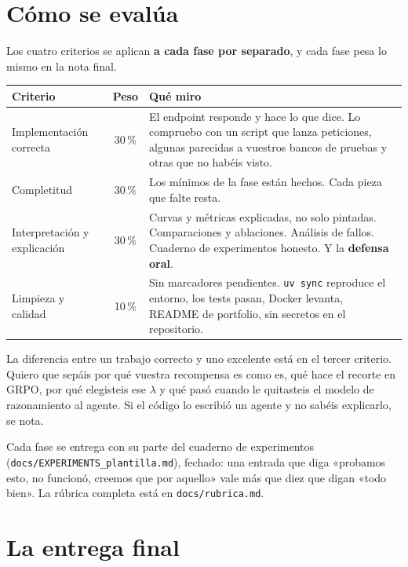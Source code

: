 \documentclass[11pt,a4paper]{article}
\newcommand{\code}[1]{{\small\texttt{#1}}}
\newcommand{\file}[1]{{\small\texttt{\textcolor{arcablue}{#1}}}}
\begin{document}
\section{Cómo se evalúa}

Los cuatro criterios se aplican \textbf{a cada fase por separado}, y cada fase pesa lo mismo
en la nota final.

\begin{center}
\small
\begin{tabularx}{\textwidth}{@{}l c X@{}}
\toprule
\textbf{Criterio} & \textbf{Peso} & \textbf{Qué miro} \\
\midrule
Implementación correcta & 30\,\% & El endpoint responde y hace lo que dice. Lo compruebo con
  un script que lanza peticiones, algunas parecidas a vuestros bancos de pruebas y otras que
  no habéis visto. \\
Completitud & 30\,\% & Los mínimos de la fase están hechos. Cada pieza que falte resta. \\
Interpretación y explicación & 30\,\% & Curvas y métricas explicadas, no solo pintadas.
  Comparaciones y ablaciones. Análisis de fallos. Cuaderno de experimentos honesto. Y la
  \textbf{defensa oral}. \\
Limpieza y calidad & 10\,\% & Sin marcadores pendientes. \code{uv sync} reproduce el entorno,
  los tests pasan, Docker levanta, README de portfolio, sin secretos en el repositorio. \\
\bottomrule
\end{tabularx}
\end{center}

La diferencia entre un trabajo correcto y uno excelente está en el tercer criterio. Quiero
que sepáis por qué vuestra recompensa es como es, qué hace el recorte en GRPO, por qué
elegisteis ese $\lambda$ y qué pasó cuando le quitasteis el modelo de razonamiento al agente.
Si el código lo escribió un agente y no sabéis explicarlo, se nota.

Cada fase se entrega con su parte del cuaderno de experimentos
(\file{docs/EXPERIMENTS\_plantilla.md}), fechado: una entrada que diga «probamos esto, no
funcionó, creemos que por aquello» vale más que diez que digan «todo bien». La rúbrica
completa está en \file{docs/rubrica.md}.

\section{La entrega final}
\end{document}

